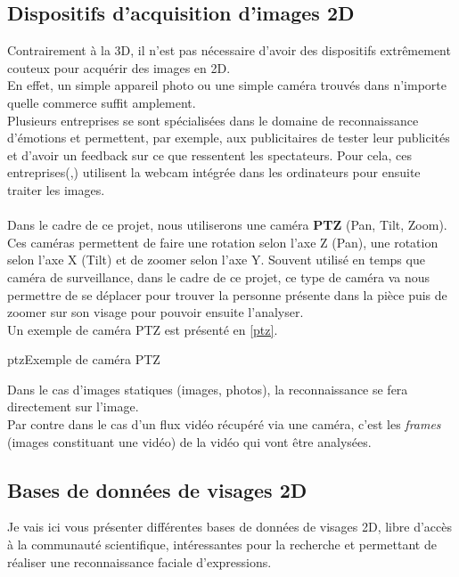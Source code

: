 \documentclass[poster]{polytech/polytech}
\begin{document}
\subsection{Dispositifs d'acquisition d'images 2D}
Contrairement à la 3D, il n'est pas nécessaire d'avoir des dispositifs extrêmement couteux pour acquérir des images en 2D.\\
En effet, un simple appareil photo ou une simple caméra trouvés dans n'importe quelle commerce suffit amplement.\\
Plusieurs entreprises se sont spécialisées dans le domaine de reconnaissance d'émotions et permettent, par exemple, aux publicitaires de tester leur publicités et d'avoir un feedback sur ce que ressentent les spectateurs. Pour cela, ces entreprises(\cite{emotient},\cite{affectiva}) utilisent la webcam intégrée dans les ordinateurs pour ensuite traiter les images.\\
\\
Dans le cadre de ce projet, nous utiliserons une caméra \textbf{PTZ} (Pan, Tilt, Zoom). Ces caméras permettent de faire une rotation selon l'axe Z (Pan), une rotation selon l'axe X (Tilt) et de zoomer selon l'axe Y. Souvent utilisé en temps que caméra de surveillance, dans le cadre de ce projet, ce type de caméra va nous permettre de se déplacer pour trouver la personne présente dans la pièce puis de zoomer sur son visage pour pouvoir ensuite l'analyser.\\
Un exemple de caméra PTZ est présenté en \autoref{ptz}.

\begin{Figure}{ptz}{Exemple de caméra PTZ}
\end{Figure}

Dans le cas d'images statiques (images, photos), la reconnaissance se fera directement sur l'image.\\
Par contre dans le cas d'un flux vidéo récupéré via une caméra, c'est les \textit{frames} (images constituant une vidéo) de la vidéo qui vont être analysées.

\newpage
\subsection{Bases de données de visages 2D}
Je vais ici vous présenter différentes bases de données de visages 2D, libre d'accès à la communauté scientifique, intéressantes pour la recherche et permettant de réaliser une reconnaissance faciale d'expressions.
\end{document}
